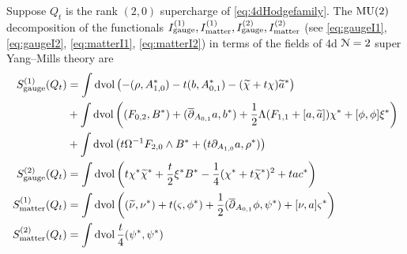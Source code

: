 \documentclass[10pt, oneside]{article}
\begin{document}
\begin{prop}
\label{4d_donaldson_susy_prop}
Suppose $Q_t$ is the rank $(2,0)$ supercharge of \ref{eq:4dHodgefamily}.
The $\mathrm{MU}(2)$ decomposition of the functionals $I_{\rm gauge}^{(1)}, I^{(1)}_{\rm matter}, I^{(2)}_{\rm gauge}, I^{(2)}_{\rm matter}$ (see \eqref{eq:gaugeI1},  \eqref{eq:gaugeI2}, \eqref{eq:matterI1}, \eqref{eq:matterI2}) in terms of the fields of 4d $\mathcal N=2$ super Yang--Mills theory are
\begin{align*}
S_{\rm gauge}^{(1)}(Q_t) &= \int \operatorname{dvol}\left(-(\rho, A_{1, 0}^*) - t(b, A_{0, 1}^*) - (\widetilde{\chi} + t\chi)\widetilde{a}^*\right) \\
& + \int\operatorname{dvol}\left((F_{0, 2}, B^*) + (\overline{\partial}_{A_{0, 1}}a, b^*) + \frac{1}{2}\Lambda(F_{1, 1}  + [a, \widetilde{a}])\chi^* + [\phi, \phi]\xi^* \right) \\
&+ \int\operatorname{dvol}\left( t\Omega^{-1} F_{2, 0}\wedge B^* + (t\partial_{A_{1, 0}} a, \rho^*)\right) \\
S^{(2)}_{\rm gauge} (Q_t) &= \int \operatorname{dvol} \left(t\chi^*\widetilde{\chi}^* + \frac{t}{2} \xi^* B^* -\frac{1}{4}(\chi^* + t\widetilde{\chi}^*)^2 + t a c^*\right) \\
S_{\rm matter}^{(1)}(Q_t) &= \int \operatorname{dvol} \left((\widetilde{\nu}, \nu^*) + t (\varsigma, \phi^*) + \frac{1}{2} (\overline{\partial}_{A_{0,1}} \phi, \psi^*) + [\nu, a]\varsigma^* \right) \\
S_{\rm matter}^{(2)}(Q_t) &= \int \operatorname{dvol} \frac t4  (\psi^*, \psi^*)
\end{align*}
\end{prop}
\end{document}
